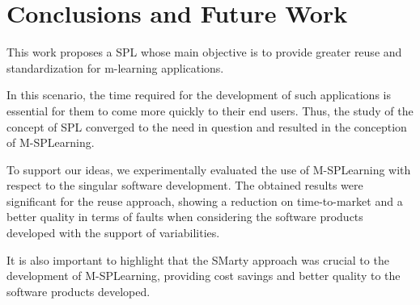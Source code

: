 \section{Conclusions and Future Work}\label{section7}



This work proposes a SPL whose main objective is to provide greater reuse and standardization for m-learning applications.


In this scenario, the time required for the development of such applications is essential for them to come more quickly to their end users. Thus, the study of the concept of SPL converged to the need in question and resulted in the conception of M-SPLearning.

To support our ideas, we experimentally evaluated the use of M-SPLearning with respect to the singular software development. The obtained results were significant for the reuse approach, showing a reduction on time-to-market and a better quality in terms of faults when considering the software products developed with the support of variabilities. 

It is also important to highlight that the SMarty approach was crucial to the development of M-SPLearning, providing cost savings and better quality to the software products developed.

